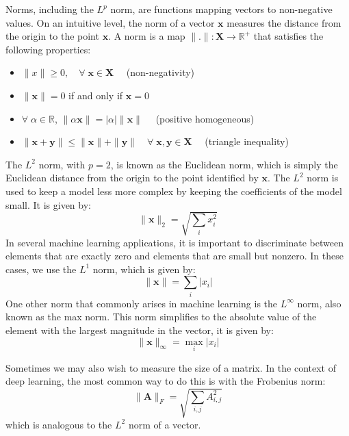 \documentclass[12pt]{report}
\numberwithin{equation}{section}
\begin{document}
Norms, including the $L^p$ norm, are functions mapping vectors to non-negative
values. On an intuitive level, the norm of a vector $\bm{x}$ measures the distance from the origin to the point $\bm{x}$. A norm is a map $\|.\|:\bm{X}\rightarrow \mathbb{R}^+$ that satisfies the following properties:
\begin{itemize}
\item $\|x\| \geq 0, \quad \forall\;\bm{x}\in\bm{X} \quad$ (non-negativity)
\item $\|\bm{x}\| = 0$ if and only if $\bm{x}=0$
\item $\forall\; \alpha\in \mathbb{R}$, $\|\alpha \bm{x}\| = |\alpha|\|\bm{x}\|\quad$ (positive homogeneous)
\item $\|\bm{x}+\bm{y}\| \leq \|\bm{x}\| + \|\bm{y}\| \quad \forall\; \bm{x},\bm{y}\in\bm{X}\quad$ (triangle inequality)
\end{itemize}
The $L^2$ norm, with $p = 2$, is known as the {Euclidean norm}, which is simply the Euclidean distance from the origin to the point identified by $\bm{x}$. The $L^2$ norm is used to keep a model less more complex by keeping the coefficients of the model small. It is given by:
\begin{equation}\label{eqn:l2-norm}
\|\bm{x}\|_2 = \sqrt{\sum_i x_i^2}
\end{equation} 
In several machine learning applications, it is important to discriminate between elements that are exactly zero and elements that are small but nonzero. In these cases, we use the $L^1$ norm, which is given by:
\begin{equation}\label{eqn:l1-norm}
\|\bm{x}\| = \sum_i |x_i|
\end{equation}
One other norm that commonly arises in machine learning is the $L^\infty$ norm, also known as the {max norm}. This norm simplifies to the absolute value of the element with the largest magnitude in the vector, it is given by:
\begin{equation}\label{eqn:max-norm}
\|\bm{x}\|_\infty = \max_i |x_i|
\end{equation}

Sometimes we may also wish to measure the size of a matrix. In the context
of deep learning, the most common way to do this is with the {Frobenius norm}:
\begin{equation}\label{eqn:fro-norm}
\|\bm{A}\|_F = \sqrt{\sum_{i,j} A_{i,j}^2}
\end{equation} 
which is analogous to the $L^2$ norm of a vector.
\end{document}
